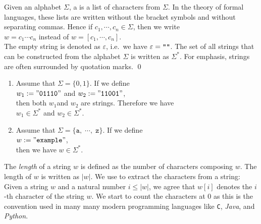 \begin{Definition}[Strings]
Given an alphabet $\Sigma$, a   is a list of characters from $\Sigma$.
In the theory of formal languages, these lists are written without the bracket symbols and without
separating commas.  Hence if $c_1,\cdots,c_n \in \Sigma$, then we write 
\\[0.2cm]
\hspace*{1.3cm}
$w = c_1\cdots c_n$ \quad instead of \quad $w = [c_1,\cdots,c_n]$.
\\[0.2cm]
The empty string is denoted as $\varepsilon$,\index{$\varepsilon$} i.e.~we have $\varepsilon =
\texttt{\symbol{34}\symbol{34}}$.
The set of all strings that can be constructed
from the alphabet $\Sigma$ is written as $\Sigma^*$. \index{$\Sigma^*$} For emphasis, strings are often
surrounded by quotation marks. \qed
\end{Definition}
\pagebreak

\examplesEng
\begin{enumerate}
\item Assume that $\Sigma = \{0, 1\}$.  If we define
      \\[0.2cm]
      \hspace*{1.3cm}
      $w_1 := \mathtt{\symbol{34}01110\symbol{34}}$ \quad and \quad $w_2 := \mathtt{\symbol{34}11001\symbol{34}}$,
      \\[0.2cm]
      then both $w_1$and $w_2$ are strings.  Therefore we have
      \\[0.2cm]
      \hspace*{1.3cm}
      $w_1 \in \Sigma^*$ \quad and \quad $w_2 \in \Sigma^*$.
\item Assume that $\Sigma = \{\mathtt{a}, \;\cdots\!,\; \mathtt{z}\}$.   If we define
      \\[0.2cm]
      \hspace*{1.3cm}
      $w := \mathtt{\symbol{34}example}\symbol{34}$,
      \\[0.2cm]
      then we have $w \in \Sigma^*$. \eox
\end{enumerate}
The \emph{length} of a string $w$ is defined as the number of characters composing $w$.
The length of $w$ is written as $|w|$.    We use  to extract the
characters from a string: 
Given a string $w$ and a natural number $i \leq |w|$, we agree that $w[i]$ denotes the $i$-th
character of the string $w$.   We start to count the characters at 0 as this is the convention used in many
many modern programming languages like \texttt{C}, \textsl{Java}, and \textsl{Python}.

